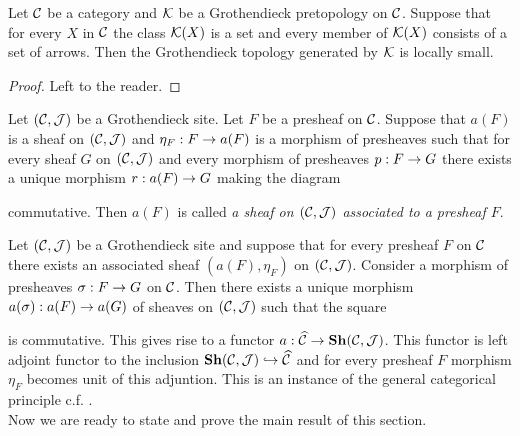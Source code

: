 \begin{fact}
Let ${\mathcal C}$ be a category and ${\mathcal K}$ be a Grothendieck pretopology on ${\mathcal C}$. Suppose that for every $X$ in ${\mathcal C}$ the class ${\mathcal K}(X)$ is a set and every member of ${\mathcal K}(X)$ consists of a set of arrows. Then the Grothendieck topology generated by ${\mathcal K}$ is locally small.
\end{fact}
\begin{proof}
Left to the reader.
\end{proof}

\begin{definition}
Let $({\mathcal C},{\mathcal J})$ be a Grothendieck site. Let $F$ be a presheaf on ${\mathcal C}$. Suppose that $a(F)$ is a sheaf on $({\mathcal C},{\mathcal J})$ and $\eta_F:F \rightarrow a(F)$ is a morphism of presheaves such that for every sheaf $G$ on $({\mathcal C},{\mathcal J})$ and every morphism of presheaves $p:F \rightarrow G$ there exists a unique morphism $r:a(F)\rightarrow G$ making the diagram
\begin{center}
\end{center}
commutative. Then $a(F)$ is called \textit{a sheaf on $({\mathcal C},{\mathcal J})$ associated to a presheaf $F$}.
\end{definition}
\noindent
Let $({\mathcal C},{\mathcal J})$ be a Grothendieck site and suppose that for every presheaf $F$ on ${\mathcal C}$ there exists an associated sheaf $\left(a(F),\eta_F\right)$ on $({\mathcal C},{\mathcal J})$. Consider a morphism of presheaves $\sigma:F\rightarrow G$ on ${\mathcal C}$. Then there exists a unique morphism $a(\sigma):a(F)\rightarrow a(G)$ of sheaves on $({\mathcal C},{\mathcal J})$ such that the square
\begin{center}
\end{center}
is commutative. This gives rise to a functor $a:\widehat{{\mathcal C}}\rightarrow \mathbf{Sh}({\mathcal C},{\mathcal J})$. This functor is left adjoint functor to the inclusion $\mathbf{Sh}({\mathcal C},{\mathcal J})\hookrightarrow \widehat{{\mathcal C}}$ and for every presheaf $F$ morphism $\eta_F$ becomes unit of this adjuntion. This is an instance of the general categorical principle c.f. {\cite[page 83, Theorem 2]{Maclane}}.\\
Now we are ready to state and prove the main result of this section.

